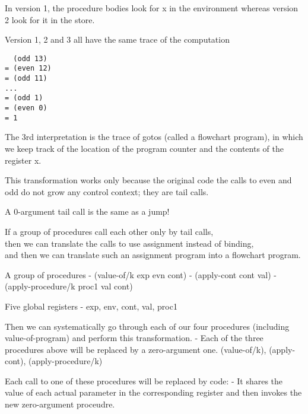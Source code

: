 \documentclass{article}
\begin{document}
\begin{huge}

In version 1, the procedure bodies look for x in the environment whereas version 2 look for it in the store.

Version 1, 2 and 3 all have the same trace of the computation 
\begin{lstlisting}
  (odd 13)
= (even 12)
= (odd 11)
...
= (odd 1)
= (even 0)
= 1
\end{lstlisting}

The 3rd interpretation is the trace of gotos (called a flowchart program), in which we keep track of the location of the program counter and the contents of the register x.


This transformation works only because the original code the calls to even and odd do not grow any control context; they are tail calls. 

A 0-argument tail call is the same as a jump!

If a group of procedures call each other only by tail calls, \\
 then we can translate the calls to use assignment instead of binding, \\
 and then we can translate such an assignment program into a flowchart program. 


A group of procedures \al
- (value-of/k exp evn cont) \al
- (apply-cont cont val) \al
- (apply-procedure/k proc1 val cont)

Five global registers \al
- exp, env, cont, val,  proc1

Then we can systematically go through each of our four procedures (including value-of-program) and perform this transformation. \al
- Each of the three procedures above will be replaced by a zero-argument one. 
(value-of/k), (apply-cont), (apply-procedure/k)

Each call to one of these procedures will be replaced by code: \al
- It shares the value of each actual parameter in the corresponding register and then invokes the new zero-argument proceudre.



\end{huge}
\end{document}
